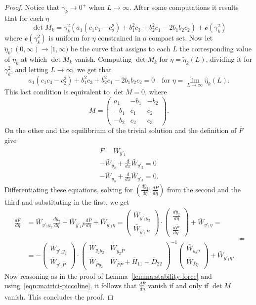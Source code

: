 \documentclass[a4paper,10pt,twoside]{amsbook}
\numberwithin{section}{chapter}
\numberwithin{equation}{chapter}
\theoremstyle{definition}
\begin{document}
\begin{proof}
Notice that $\gamma_k\to0^+$ when $L\to\infty$. After some computations it results that for each $\eta$
\[
\det M_k=\gamma_k^2(a_1(c_1c_3 - c_2^2) + b_1^2c_3 + b_2^2c_1 - 2b_1b_2c_2)+\mathscr{o}(\gamma_k^2)
\]
where $\mathscr{o}(\gamma_k^2)$ is uniform for $\eta$ constrained in a compact set. Now let $\tilde\eta_k\colon(0,\infty)\to[1,\infty)$ be the curve that assigns to each $L$ the corresponding value of $\eta_k$ at which $\det M_k$ vanish. Computing $\det M_k$ for $\eta=\tilde\eta_k(L)$, dividing it for $\gamma_k^2$, and letting $L\to\infty$, we get that
\[
a_1(c_1c_3 - c_2^2) + b_1^2c_3 + b_2^2c_1 - 2b_1b_2c_2=0\quad\text{for $\eta=\lim_{L\to\infty}\hat{\eta}_k(L)$.}
\]
This last condition is equivalent to $\det M=0$, where
\[
M=\begin{pmatrix}
    a_1  & -b_1 & -b_2 \\
    -b_1 &  c_1 &  c_2 \\
    -b_2 &  c_2 &  c_3
\end{pmatrix}.
\]
On the other and the equilibrium of the trivial solution and the definition of $\bar F$ give
\begin{gather*}
\bar{F} = \bar{W}_{y'_1} \\
-\bar{W}_{y_2} + \frac{d}{dx} \bar{W}_{y'_2} = 0 \\
-\bar{W}_{y_3} + \frac{d}{dx} \bar{W}_{y'_3} = 0.
\end{gather*}
Differentiating these equations, solving for $\left(\frac{d\bar y_2}{d\eta};\frac{d\bar P}{d\eta}\right)$ from the second and the third and substituting in the first, we get
\[
\begin{split}
\frac{d\bar{F}}{d\eta} &= \bar{W}_{y'_1 y_2} \frac{d\bar{y}_2}{d\eta} + \bar{W}_{y'_1 \bar{P}} \frac{d\bar{P}}{d\eta} + \bar{W}_{y'_1 \eta} = 
\begin{pmatrix} \bar{W}_{y'_1 y_2} \\ \bar{W}_{y'_1 \bar{P}} \end{pmatrix} \cdot 
\begin{pmatrix} \frac{d\bar{y}_2}{d\eta} \\ \frac{d\bar{P}}{d\eta} \end{pmatrix} + \bar{W}_{y'_1 \eta}=\\
&=- \begin{pmatrix} \bar{W}_{y'_1 y_2} \\ \bar{W}_{y'_1 \bar{P}} \end{pmatrix} \cdot 
\begin{pmatrix} 
    \bar{W}_{y_2 y_2} & \bar{W}_{y_2 \bar{P}} \\ 
    \bar{W}_{\bar{P} y_2} & \bar{W}_{\bar{P} \bar{P}} + \bar{H}_{11} + \bar{D}_{22} 
\end{pmatrix}^{-1} 
\begin{pmatrix} \bar{W}_{y_2 \eta} \\ \bar{W}_{\bar{P} \eta} \end{pmatrix} + \bar{W}_{y'_1 \eta}.
\end{split}=
\]
Now reasoning as in the proof of Lemma~\ref{lemma:stability-force} and using~\eqref{eqn:matrici-piccoline}, it follows that $\frac{d\bar{F}}{d\eta}$ vanish if and only if $\det M$ vanish. This concludes the proof.
\end{proof}
\end{document}
